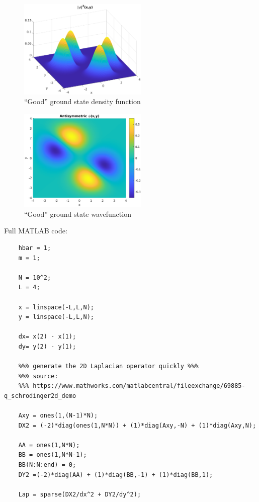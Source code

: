\documentclass{article}
\theoremstyle{definition}
\begin{document}
\begin{enumerate}[label=(\alph*)]
	\begin{figure}[!htb]
		\centering
		\includegraphics[width=0.55\textwidth]{problem3c1.eps}
		\caption{``Good'' ground state density function}
	\end{figure}
	
	\begin{figure}[!htb]
		\centering
		\includegraphics[width=0.55\textwidth]{problem3c2.eps}
		\caption{``Good'' ground state wavefunction}
	\end{figure}


	Full MATLAB code:
	\begin{lstlisting}
	hbar = 1;
	m = 1;
	
	N = 10^2;
	L = 4;
	
	x = linspace(-L,L,N);
	y = linspace(-L,L,N);
	
	dx= x(2) - x(1);
	dy= y(2) - y(1);
	
	%%% generate the 2D Laplacian operator quickly %%%
	%%% source:
	%%% https://www.mathworks.com/matlabcentral/fileexchange/69885-q_schrodinger2d_demo 
	
	Axy = ones(1,(N-1)*N);
	DX2 = (-2)*diag(ones(1,N*N)) + (1)*diag(Axy,-N) + (1)*diag(Axy,N);
	
	AA = ones(1,N*N);
	BB = ones(1,N*N-1);
	BB(N:N:end) = 0;
	DY2 =(-2)*diag(AA) + (1)*diag(BB,-1) + (1)*diag(BB,1);
	
	Lap = sparse(DX2/dx^2 + DY2/dy^2);
	

\end{lstlisting}
\end{enumerate}
\end{document}
